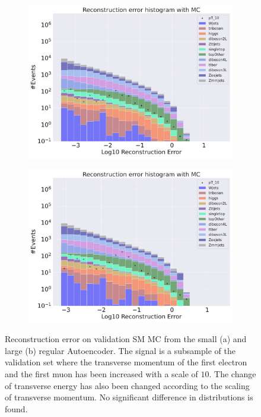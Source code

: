 \begin{figure}[H]
    \centering
    \begin{subfigure}{.45\textwidth}
        \includegraphics[width=\textwidth]{Figures/AE_testing/small/b_data_recon_big_rm3_feats_sig_pT_10.pdf}
        \caption{}
        \label{fig:ae_small_pt_10}
    \end{subfigure}
    \hfill 
    \begin{subfigure}{.45\textwidth}
        \includegraphics[width=\textwidth]{Figures/AE_testing/big/b_data_recon_big_rm3_feats_sig_pT_10.pdf}
        \caption{}
        \label{fig:ae_big_pt_10}
    \end{subfigure}
    \hfill 
    \caption[AE | Reconstruction error $p_T$ altering of 10]{Reconstruction error on validation SM MC from the small (a) and large (b) regular Autoencoder. The signal is a subsample of the validation 
    set where the transverse momentum of the first electron and the first muon has been increased with a scale of $10$. The change of transverse 
    energy has also been changed according to the scaling of transverse momentum. No significant difference in distributions is found. }
    \label{fig:ae_big_small_pt_10}
\end{figure}




